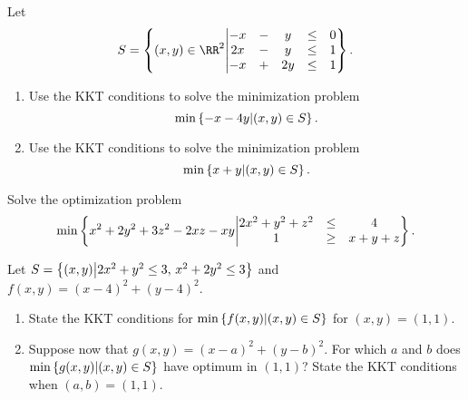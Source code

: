 \documentclass{article}
\begin{document}
\beginshex

  Let
  \begin{equation*}
    S = \Set{ (x, y)\in \RR^2 }{
      \begin{matrix}
        -x  & - & y   & \leq & 0 \\
        2 x & - & y   & \leq & 1 \\
        -x & + & 2 y & \leq & 1
      \end{matrix}
    }.
  \end{equation*}
  \begin{enumerate}
  \item Use the KKT conditions to solve the minimization problem
    \begin{equation*}
      \min\left\{  -x - 4 y  \middle| (x, y)\in S  \right\}.
    \end{equation*} 

  \item Use the KKT conditions to solve the minimization problem
    \begin{equation*}
      \min\left\{  x + y  \middle|  (x, y)\in S  \right\}.
    \end{equation*} 
  \end{enumerate}
\endshex

\beginshex
  Solve the optimization problem
  \begin{equation*}
    \min\left\{ x^2 + 2 y^2 + 3 z^2- 2 x z - x y \middle| 
      \begin{matrix}
        2x^2 + y^2 + z^2 & \leq & 4 \\
        1 & \geq & x+y+z
      \end{matrix}
     \right\}.
  \end{equation*}
  \endshex

  \beginshex
  
  Let $S =\left\{  (x, y)  \middle|  2 x^2 + y^2 \leq 3, \, x^2 + 2y^2 \leq 3  \right\}$
  and $f(x, y) = (x-4)^2 + (y-4)^2$.
  \begin{enumerate}
  \item State the KKT conditions for $\min\left\{  f(x, y)  \middle|  (x, y)\in S
     \right\}$ for $(x, y) = (1,1)$.
  \item Suppose now that $g(x, y) = (x-a)^2 + (y-b)^2$. For which $a$
    and $b$ does $\min\left\{  g(x, y)  \middle|  (x, y)\in S  \right\}$ have optimum in
    $(1,1)$?  State the KKT conditions when $(a, b) = (1,1)$.
  \end{enumerate}
\endshex


\beginshex
\end{document}
